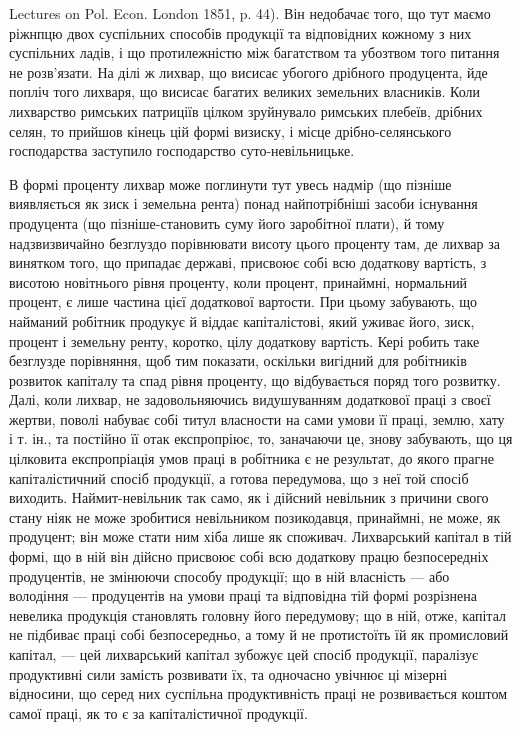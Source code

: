 \parcont{}  %
Lectures on Pol. Econ. London 1851, p. 44). Він недобачає того, що тут маємо
ріжнпцю двох суспільних способів продукції та відповідних кожному з них
суспільних ладів, і що протилежністю між багатством та убозтвом того питання
не розв’язати. На ділі ж лихвар, що висисає убогого дрібного продуцента, йде
попліч того лихваря, що висисає багатих великих земельних власників. Коли
лихварство римських патриціїв цілком зруйнувало римських плебеїв, дрібних
селян, то прийшов кінець цій формі визиску, і місце дрібно-селянського господарства
заступило господарство суто-невільницьке.

В формі проценту лихвар може поглинути тут увесь надмір (що пізніше
виявляється як зиск і земельна рента) понад найпотрібніші засоби існування
продуцента (що пізніше-становить суму його заробітної плати), й тому надзвизвичайно
безглуздо порівнювати висоту цього проценту там, де лихвар за винятком
того, що припадає державі, присвоює собі всю додаткову вартість, з висотою
новітнього рівня проценту, коли процент, принаймні, нормальний процент, є лише
частина цієї додаткової вартости. При цьому забувають, що найманий робітник
продукує й віддає капіталістові, який уживає його, зиск, процент і земельну
ренту, коротко, цілу додаткову вартість. Кері робить таке безглузде порівняння,
щоб тим показати, оскільки вигідний для робітників розвиток капіталу та спад
рівня проценту, що відбувається поряд того розвитку. Далі, коли лихвар, не
задовольняючись видушуванням додаткової праці з своєї жертви, поволі набуває
собі титул власности на сами умови її праці, землю, хату і т. ін., та постійно
її отак експропріює, то, заначаючи це, знову забувають, що ця цілковита експропріація
умов праці в робітника є не результат, до якого прагне капіталістичний
спосіб продукції, а готова передумова, що з неї той спосіб виходить. Наймит-невільник
так само, як і дійсний невільник з причини свого стану ніяк не може
зробитися невільником позикодавця, принаймні, не може, як продуцент; він може
стати ним хіба лише як споживач. Лихварський капітал в тій формі, що в ній
він дійсно присвоює собі всю додаткову працю безпосередніх продуцентів, не
змінюючи способу продукції; що в ній власність — або володіння — продуцентів
на умови праці та відповідна тій формі розрізнена невелика продукція становлять
головну його передумову; що в ній, отже, капітал не підбиває праці собі безпосередньо,
а тому й не протистоїть їй як промисловий капітал, — цей лихварський
капітал зубожує цей спосіб продукції, паралізує продуктивні сили
замість розвивати їх, та одночасно увічнює ці мізерні відносини, що серед них
суспільна продуктивність праці не розвивається коштом самої праці, як то є за
капіталістичної продукції.

